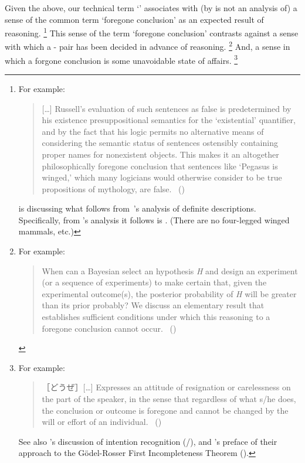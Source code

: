 \begin{note}
  Given the above, our technical term `\fc{}' associates with (by is not an analysis of) a sense of the common term `foregone conclusion' as an expected result of reasoning.%
  \footnote{
    For example:

    \begin{quote}
      [\dots] Russell's evaluation of such sentences as false is predetermined by his existence presuppositional semantics for the ‘existential' quantifier, and by the fact that his logic permits no alternative means of considering the semantic status of sentences ostensibly containing proper names for nonexistent objects.
      This makes it an altogether philosophically foregone conclusion that sentences like ‘Pegasus is winged,' which many logicians would otherwise consider to be true propositions of mythology, are false.%
      \mbox{ }\hfill\mbox{(\cite[6]{Jacquette:2002up})}
    \end{quote}

    \noindent \citeauthor{Jacquette:2002up} is discussing what follows from~\citeauthor{Russell:1905aa}'s analysis of definite descriptions.
    Specifically, from \citeauthor{Russell:1905aa}'s analysis it follows  is .
    (There are no four-legged winged mammals, etc.)
  }
  This sense of the term `foregone conclusion' contrasts against a sense with which a - pair has been decided in advance of reasoning.%
  \footnote{
    For example:
    \begin{quote}
      When can a Bayesian select an hypothesis \emph{H} and design an experiment (or a sequence of experiments) to make certain that, given the experimental outcome(s), the posterior probability of \emph{H} will be greater than its prior probably?
      We discuss an elementary result that establishes sufficient conditions under which this reasoning to a foregone conclusion cannot occur.%
      \mbox{ }\hfill\mbox{(\cite[1228]{Kadane:1996vu})}
    \end{quote}
  }
  And, a sense in which a forgone conclusion is some unavoidable state of affairs.%
  \footnote{
    For example:
    \begin{quote}
      ［どうぜ］[\dots] Expresses an attitude of resignation or carelessness on the part of the speaker, in the sense that regardless of what s/he does, the conclusion or outcome is foregone and cannot be changed by the will or effort of an individual.%
      \mbox{ }\hfill\mbox{(\cite[332--333]{kurufushamashii:2015un})}
    \end{quote}
    See also \citeauthor{Grice:1957vg}'s discussion of intention recognition (\citeyear[385]{Grice:1957vg}/\citeyear[219]{Grice:1989uf}), and \citeauthor{Machover:1996vu}'s preface of their approach to the G\"{o}del-Rosser First Incompleteness Theorem (\citeyear[viii]{Machover:1996vu}).
  }
\end{note}



